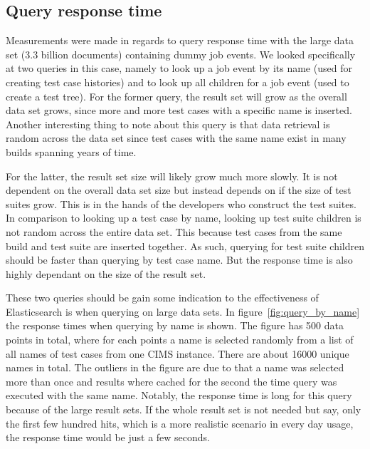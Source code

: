 

\subsection{Query response time}

Measurements were made in regards to query response time with the large data set (3.3 billion documents) containing dummy job events. We looked specifically at two queries in this case, namely to look up a job event by its name (used for creating test case histories) and to look up all children for a job event (used to create a test tree). For the former query, the result set will grow as the overall data set grows, since more and more test cases with a specific name is inserted. Another interesting thing to note about this query is that data retrieval is random across the data set since test cases with the same name exist in many builds spanning years of time.

For the latter, the result set size will likely grow much more slowly. It is not dependent on the overall data set size but instead depends on if the size of test suites grow. This is in the hands of the developers who construct the test suites. In comparison to looking up a test case by name, looking up test suite children is not random across the entire data set. This because test cases from the same build and test suite are inserted together. As such, querying for test suite children should be faster than querying by test case name. But the response time is also highly dependant on the size of the result set.

These two queries should be gain some indication to the effectiveness of Elasticsearch is when querying on large data sets. In figure~\ref{fig:query_by_name} the response times when querying by name is shown. The figure has 500 data points in total, where for each points a name is selected randomly from a list of all names of test cases from one CIMS instance. There are about 16000 unique names in total. The outliers in the figure are due to that a name was selected more than once and results where cached for the second the time query was executed with the same name. Notably, the response time is long for this query because of the large result sets. If the whole result set is not needed but say, only the first few hundred hits, which is a more realistic scenario in every day usage, the response time would be just a few seconds.

